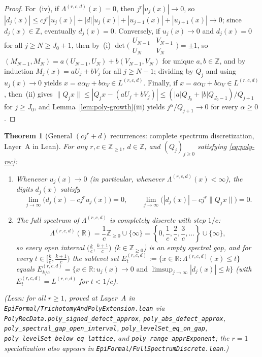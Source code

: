 \documentclass[11pt]{article}
\newtheorem{theorem}{Theorem}
\theoremstyle{definition}
\theoremstyle{remark}
\newcommand{\R}{\mathbb{R}}
\newcommand{\Z}{\mathbb{Z}}
\newcommand{\Lam}{\Lambda}
\begin{document}
\begin{proof}
For~(iv), if $\Lam^{(r,c,d)}(x)=0$, then $j^r|u_j(x)|\to0$, so
$|d_j(x)|\le cj^r|u_j(x)|+|d||u_j(x)|+|u_{j-1}(x)|+|u_{j+1}(x)|\to0$; since
$d_j(x)\in\Z$, eventually $d_j(x)=0$. Conversely, if $u_j(x)\to0$ and $d_j(x)=0$
for all $j\ge N\ge J_0+1$, then by~(i)
$\det\bigl(\begin{smallmatrix}U_{N-1}&V_{N-1}\\U_N&V_N\end{smallmatrix}\bigr)=\pm1$,
so $(M_{N-1},M_N)=a(U_{N-1},U_N)+b(V_{N-1},V_N)$ for unique $a,b\in\Z$, and by
induction $M_j(x)=aU_j+bV_j$ for all $j\ge N-1$; dividing by $Q_j$ and using
$u_j(x)\to0$ yields $x=a\alpha_U+b\alpha_V\in L^{(r,c,d)}$. Finally, if
$x=a\alpha_U+b\alpha_V\in L^{(r,c,d)}$, then~(ii) gives
$\|Q_jx\|\le|Q_jx-(aU_j+bV_j)|\le(|a|Q_{J_0}+|b|Q_{J_0-1})/Q_{j+1}$ for
$j\ge J_0$, and Lemma~\ref{lem:poly-growth}(iii) yields $j^\alpha/Q_{j+1}\to0$
for every $\alpha\ge0$.
\end{proof}

\begin{theorem}[General $(cj^r+d)$ recurrences: complete spectrum discretization,
Layer~A in Lean]\label{thm:general-rec}
For any $r,c\in\Z_{\ge1}$, $d\in\Z$, and $(Q_j)_{j\ge0}$ satisfying
\eqref{eq:poly-rec}:
\begin{enumerate}[label=(\roman*),leftmargin=2em]
\item Whenever $u_j(x)\to0$ (in particular, whenever $\Lam^{(r,c,d)}(x)<\infty$),
the digits $d_j(x)$ satisfy
\[
\lim_{j\to\infty}\bigl(d_j(x)-cj^ru_j(x)\bigr)=0,\qquad
\lim_{j\to\infty}\bigl(|d_j(x)|-cj^r\|Q_jx\|\bigr)=0.
\]
\item The full spectrum of $\Lam^{(r,c,d)}$ is completely discrete with step $1/c$:
\[
\Lam^{(r,c,d)}(\R)=\frac{1}{c}\Z_{\ge0}\cup\{\infty\}
=\left\{0,\frac{1}{c},\frac{2}{c},\frac{3}{c},\dots\right\}\cup\{\infty\},
\]
so every open interval $\bigl(\frac{k}{c},\frac{k+1}{c}\bigr)$ ($k\in\Z_{\ge0}$)
is an empty spectral gap, and for every $t\in\bigl[\frac{k}{c},\frac{k+1}{c}\bigr)$
the sublevel set $E_t^{(r,c,d)}:=\{x\in\R:\Lam^{(r,c,d)}(x)\le t\}$ equals
$E_{k/c}^{(r,c,d)}=\{x\in\R:u_j(x)\to0\text{ and }\limsup_{j\to\infty}|d_j(x)|\le k\}$
(with $E_t^{(r,c,d)}=L^{(r,c,d)}$ for $t<1/c$).
\end{enumerate}
(Lean: for all $r\ge1$, proved at Layer~A in
\texttt{EpiFormal/\allowbreak TrichotomyAndPolyExtension.lean} via
\texttt{PolyRecData.\allowbreak poly\_\allowbreak signed\_\allowbreak defect\_\allowbreak approx},
\texttt{poly\_\allowbreak abs\_\allowbreak defect\_\allowbreak approx},
\texttt{poly\_\allowbreak spectral\_\allowbreak gap\_\allowbreak open\_\allowbreak interval},
\texttt{poly\_\allowbreak levelSet\_\allowbreak eq\_\allowbreak on\_\allowbreak gap},
\texttt{poly\_\allowbreak levelSet\_\allowbreak below\_\allowbreak eq\_\allowbreak lattice}, and
\texttt{poly\_\allowbreak range\_\allowbreak apprExponent}; the $r=1$
specialization also appears in
\texttt{EpiFormal/\allowbreak Full\allowbreak Spectrum\allowbreak Discrete.lean}.)
\end{theorem}
\end{document}
